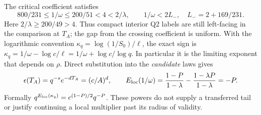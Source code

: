 \documentclass[11pt]{article}
\begin{document}
The critical coefficient satisfies
\[
 800/231\le1/\omega\le200/51<4<2/\lambda,\qquad
 1/\omega<2L_-,\quad L_-=2+169/231 .
\]
Here \(2/\lambda\ge200/49>4\). Thus compact interior Q2 labels
are still left-facing in the comparison at \(T_A\); the gap from the
crossing coefficient is uniform. With the logarithmic convention
\(\kappa_q=\log(1/S_0)/\ell\), the exact sign is
\(\kappa_q=1/\omega-\log c/\ell=1/\omega+\log c/\log q\).
In particular it is the limiting exponent that depends on \(\rho\).
Direct substitution into the \emph{candidate} laws gives
\[
 \epsilon(T_A)=q^{-s}e^{-dT_A}=(c/A)^d,\qquad
 E_{\rm loc}(1/\omega)=\frac{1-P}{1-\lambda}
                     -\frac{1-\lambda P}{1-\lambda}=-P .
\]
Formally \(q^{E_{\rm loc}(\kappa_q)}=c^{(1-P)/2}q^{-P}\).
These powers do not supply a transferred tail or justify continuing a
local multiplier past its radius of validity.
\end{document}
